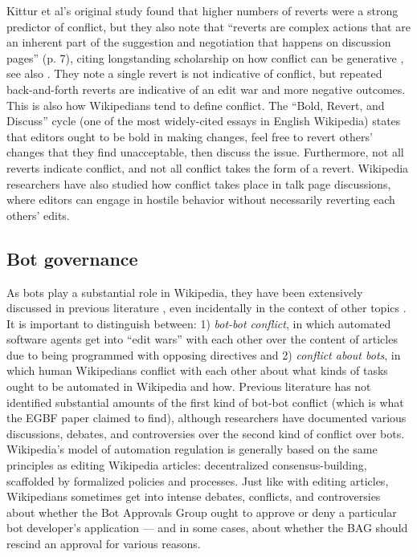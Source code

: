 \documentclass[format=acmsmall, review=false, screen=true]{acmart}%
\begin{document}
Kittur et al's original study \cite{Kittur2007a} found that higher numbers of reverts were a strong predictor of conflict, but they also note that ``reverts are complex actions that are an inherent part of the suggestion and negotiation that happens on discussion pages'' (p. 7), citing longstanding scholarship on how conflict can be generative \cite{Franco1995}, see also \cite{Kling1991}. They note a single revert is not indicative of conflict, but repeated back-and-forth reverts are indicative of an edit war and more negative outcomes. This is also how Wikipedians tend to define conflict. The ``Bold, Revert, and Discuss'' cycle (one of the most widely-cited essays \cite{Halfaker2013} in English Wikipedia) states that editors ought to be bold in making changes, feel free to revert others' changes that they find unacceptable, then discuss the issue. Furthermore, not all reverts indicate conflict, and not all conflict takes the form of a revert. Wikipedia researchers have also studied how conflict takes place in talk page discussions, where editors can engage in hostile behavior without necessarily reverting each others' edits. \cite{Menking2015}

\subsection{Bot governance}  \label{s:lit:botgov}

As bots play a substantial role in Wikipedia, they have been extensively discussed in previous literature \cite{Geiger2011a, Halfaker2012, Kennedy2010, DeLaat2015, Livingstone2016, Muller-Birn2013, Niederer2010}, even incidentally in the context of other topics \cite{Bruckman2008, Burke2008, Geiger2010, Kriplean2008}. It is important to distinguish between: 1) \textit{bot-bot conflict}, in which automated software agents get into ``edit wars'' with each other over the content of articles due to being programmed with opposing directives and 2) \textit{conflict about bots}, in which human Wikipedians conflict with each other about what kinds of tasks ought to be automated in Wikipedia and how. Previous literature has not identified substantial amounts of the first kind of bot-bot conflict (which is what the EGBF paper claimed to find), although researchers have documented various discussions, debates, and controversies over the second kind of conflict over bots. Wikipedia's model of automation regulation is generally based on the same principles as editing Wikipedia articles: decentralized consensus-building, scaffolded by formalized policies and processes. Just like with editing articles, Wikipedians sometimes get into intense debates, conflicts, and controversies about whether the Bot Approvals Group ought to approve or deny a particular bot developer's application --- and in some cases, about whether the BAG should rescind an approval for various reasons.
\end{document}
